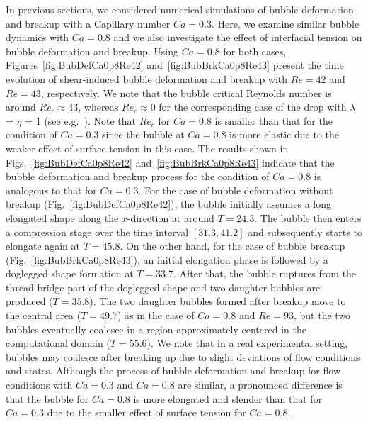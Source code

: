 \documentclass[%
 reprint,
 showkeys,
 amsmath,amssymb,
 aps,
 prfluids,
 onecolumn
]{revtex4-2}
\begin{document}
%
In previous sections, we considered numerical simulations of bubble deformation
and breakup with a Capillary number $Ca = 0.3$.  Here, we examine similar
bubble dynamics with $Ca = 0.8$ and we also investigate the effect of
interfacial tension on bubble deformation and breakup.  Using $Ca=0.8$ for both
cases, Figures~\ref{fig:BubDefCa0p8Re42} and~\ref{fig:BubBrkCa0p8Re43} present
the time evolution of shear-induced bubble deformation and breakup with $Re=42$
and $Re=43$, respectively.  We note that the bubble critical Reynolds number is
around $Re_{c} \approx 43$, whereas $Re_{c} \approx 0$ for the corresponding
case of the drop with 
$\lambda$ = $\eta$ = 1 (see e.g.~\cite{LiRenRen00}).
Note that $Re_{c}$ for $Ca = 0.8$ is smaller than that for the condition of $Ca
= 0.3$ since the bubble at $Ca = 0.8$ is more elastic due to the weaker effect
of surface tension in this case.  The results shown in
Figs.~\ref{fig:BubDefCa0p8Re42} and~\ref{fig:BubBrkCa0p8Re43} indicate that the
bubble deformation and breakup process for the condition of $Ca = 0.8$ is
analogous to that for $Ca = 0.3$.  For the case of bubble deformation without
breakup (Fig.~\ref{fig:BubDefCa0p8Re42}), the bubble initially assumes a long
elongated shape along the $x$-direction at around $T=24.3$. The bubble then
enters a compression stage over the time interval $[31.3,41.2]$ and
subsequently starts to elongate again at $T = 45.8$.  On the other hand, for
the case of bubble breakup (Fig.~\ref{fig:BubBrkCa0p8Re43}), an initial
elongation phase is followed by a doglegged shape formation at $T=33.7$.  After
that, the bubble ruptures from the thread-bridge part of the doglegged shape
and two daughter bubbles are produced ($T = 35.8$).  The two daughter bubbles
formed after breakup move to the central area ($T = 49.7$) as in the case of
$Ca = 0.8$ and $Re = 93$, but the two bubbles eventually coalesce in a region
approximately centered in the computational domain ($T = 55.6$).  We note that
in a real experimental setting, bubbles may coalesce after breaking up due to
slight deviations of flow conditions and states.  Although the process of
bubble deformation and breakup for flow conditions with $Ca = 0.3$ and $Ca =
0.8$ are similar, a pronounced difference is that the bubble for $Ca = 0.8$ is
more elongated and slender than that for $Ca = 0.3$ due to the smaller effect
of surface tension for $Ca = 0.8$.
\end{document}
